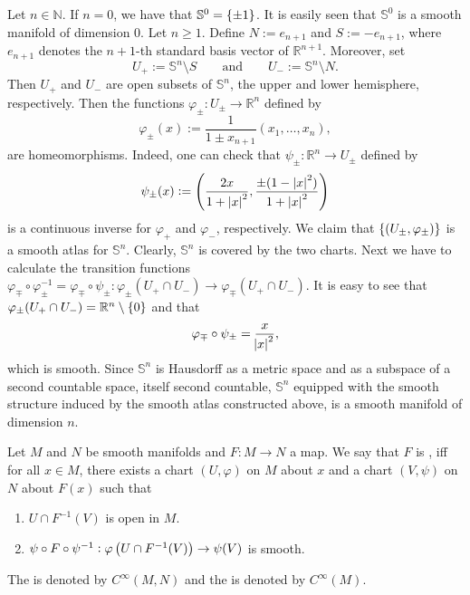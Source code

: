 \begin{example}[$n$-Spheres]
	Let $n \in \mathbb{N}$. If $n = 0$, we have that $\mathbb{S}^0 = \cbr{\pm 1}$. It is easily seen that $\mathbb{S}^0$ is a smooth manifold of dimension $0$. Let $n \geq 1$. Define $N := e_{n + 1}$ and $S := -e_{n + 1}$, where $e_{n + 1}$ denotes the $n + 1$-th standard basis vector of $\mathbb{R}^{n + 1}$. Moreover, set
	\begin{equation*}
		U_+ := \mathbb{S}^n \setminus S \qquad \text{and} \qquad U_- := \mathbb{S}^n \setminus N.
	\end{equation*}
	Then $U_+$ and $U_-$ are open subsets of $\mathbb{S}^n$, the upper and lower hemisphere, respectively. Then the functions $\varphi_\pm : U_\pm \to \mathbb{R}^n$ defined by
	\begin{equation*}
		\varphi_\pm(x) := \frac{1}{1 \pm x_{n + 1}}(x_1,\dots,x_n),
	\end{equation*}
	\noindent are homeomorphisms. Indeed, one can check that $\psi_\pm : \mathbb{R}^n \to U_\pm$ defined by
	\begin{equation*}
		\psi_\pm(x) := \del[4]{\frac{2x}{1 + \abs[0]{x}^2}, \frac{\pm(1 - \abs[0]{x}^2)}{1 + \abs[0]{x}^2}} 
	\end{equation*}
	\noindent is a continuous inverse for $\varphi_+$ and $\varphi_-$, respectively. We claim that $\cbr[0]{(U_\pm,\varphi_\pm)}$ is a smooth atlas for $\mathbb{S}^n$. Clearly, $\mathbb{S}^n$ is covered by the two charts. Next we have to calculate the transition functions $\varphi_\mp \circ \varphi^{-1}_\pm = \varphi_\mp \circ \psi_\pm : \varphi_\pm(U_+ \cap U_-) \to \varphi_\mp(U_+ \cap U_-)$. It is easy to see that $\varphi_\pm(U_+ \cap U_-) = \mathbb{R}^n \setminus \cbr{0}$ and that
	\begin{equation*}
		\varphi_\mp \circ \psi_\pm = \frac{x}{\abs{x}^2},
	\end{equation*}
	\noindent which is smooth. Since $\mathbb{S}^n$ is Hausdorff as a metric space and as a subspace of a second countable space, itself second countable, $\mathbb{S}^n$ equipped with the smooth structure induced by the smooth atlas constructed above, is a smooth manifold of dimension $n$.
\end{example}

\begin{definition}
	Let $M$ and $N$ be smooth manifolds and $F : M \to N$ a map. We say that $F$ is , iff for all $x \in M$, there exists a chart $(U,\varphi)$ on $M$ about $x$ and a chart $(V,\psi)$ on $N$ about $F(x)$ such that
	\begin{enumerate}[label = \textup{(\roman*)},leftmargin=*]
		\item $U \cap F^{-1}(V)$ is open in $M$.
		\item $\psi \circ F \circ \psi^{-1} : \varphi\del[1]{U \cap F^{-1}(V)} \to \psi(V)$ is smooth.
	\end{enumerate}
	The  is denoted by $C^\infty(M,N)$ and the  is denoted by $C^\infty(M)$.
\end{definition}

